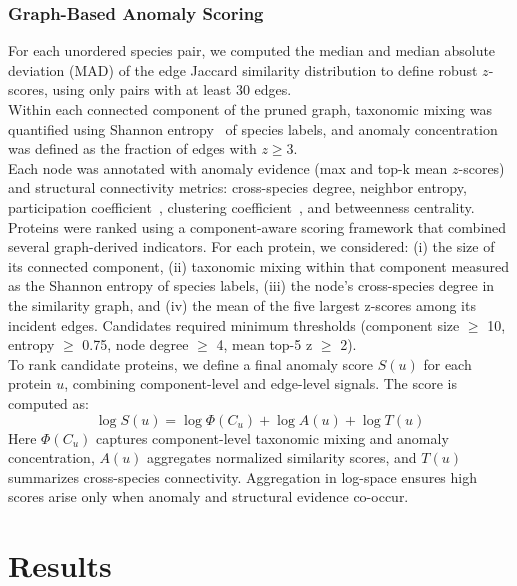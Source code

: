 \documentclass[11pt]{article}
\begin{document}
	\subsubsection{Graph-Based Anomaly Scoring}
	For each unordered species pair, we computed the median and median absolute deviation (MAD) of the edge Jaccard similarity distribution to define robust $z$-scores, using only pairs with at least 30 edges.\\
	Within each connected component of the pruned graph, taxonomic mixing was quantified using Shannon entropy~\cite{ShannonEntropy} of species labels, and anomaly concentration was defined as the fraction of edges with $z\ge3$.\\
	Each node was annotated with anomaly evidence (max and top-k mean $z$-scores) and structural connectivity metrics: cross-species degree, neighbor entropy, participation coefficient~\cite{Guimera2005}, clustering coefficient~\cite{Watts1998}, and betweenness centrality.\\
	Proteins were ranked using a component-aware scoring framework that combined several graph-derived indicators. For each protein, we considered: (i) the size of its connected component, (ii) taxonomic mixing within that component measured as the Shannon entropy of species labels, (iii) the node’s cross-species degree in the similarity graph, and (iv) the mean of the five largest z-scores among its incident edges. Candidates required minimum thresholds (component size $\geq$ 10, entropy $\geq$ 0.75, node degree $\geq$ 4, mean top-5 z $\geq$ 2).\\
	To rank candidate proteins, we define a final anomaly score $S(u)$ for each protein $u$, combining component-level and edge-level signals. The score is computed as:
	\begin{equation*}
	\log S(u) = \log \Phi(C_u) + \log A(u) + \log T(u)
	\end{equation*}
	\noindent
	Here $\Phi(C_u)$ captures component-level taxonomic mixing and anomaly concentration, $A(u)$ aggregates normalized similarity scores, and $T(u)$ summarizes cross-species connectivity. Aggregation in log-space ensures high scores arise only when anomaly and structural evidence co-occur. 
	
	\FloatBarrier
	
	\section{Results}
\end{document}
